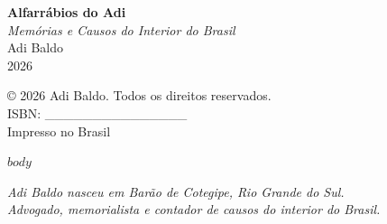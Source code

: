 \documentclass[11pt,twoside,openright]{book}
\begin{document}
\begin{titlepage}
\thispagestyle{empty}
\vspace*{\fill}
\begin{center}
  {\fontsize{32}{38}\selectfont\bfseries Alfarrábios do Adi}\\[16pt]
  {\large\itshape Memórias e Causos do Interior do Brasil}\\[32pt]
  {\Large Adi Baldo}\\[48pt]
  {\normalsize 2026}
\end{center}
\vspace*{\fill}
\end{titlepage}

\newpage
\thispagestyle{empty}
\vspace*{\fill}
\begin{flushleft}
{\small
© 2026 Adi Baldo. Todos os direitos reservados.\\[8pt]
ISBN: \_\_\_\_\_\_\_\_\_\_\_\_\_\_\_\\[8pt]
Impresso no Brasil
}
\end{flushleft}
\vspace*{\fill}

\tableofcontents
\cleardoublepage

$body$

\cleardoublepage
\thispagestyle{empty}
\vspace*{\fill}
\begin{center}
{\small\itshape
Adi Baldo nasceu em Barão de Cotegipe, Rio Grande do Sul.\\
Advogado, memorialista e contador de causos do interior do Brasil.
}
\end{center}
\vspace*{\fill}
\end{document}
